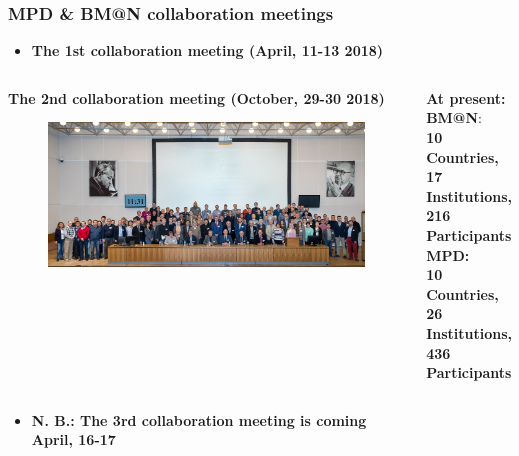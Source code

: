 \documentclass[dvipsnames] {beamer}
\begin{document}
\begin{frame}
  \frametitle{\bf \centering \footnotesize MPD \& BM@N collaboration meetings}
  
  \begin{block}{}
    \begin{itemize}
      \item \bf \centering \scriptsize The 1st collaboration meeting {\color{red} (April, 11-13 2018)}
    \end{itemize}
   \end{block}
  \begin{columns}[c]   
     \begin{block}{\bf \centering \scriptsize The 2nd collaboration meeting {\color{red} (October, 29-30 2018)}}
       \begin{figure}[H]
         \includegraphics[width=1.\linewidth]{2nd_collab.jpg}
       \end{figure}
     \end{block}
     
     {\footnotesize 
  \begin{block}{\bf \centering At present:}
    {\bf \color{red} BM@N}: \\ \bf	10 Countries, \\ 17 Institutions, \\ 216 Participants \\    
    {\bf \color{blue} MPD}: \\ \bf	10 Countries, \\ 26 Institutions, \\ 436 Participants   
  \end{block}
  }

  \end{columns}
  
  \begin{block}{}
    \begin{itemize}
      \item \bf \centering N. B.: The 3rd collaboration meeting is coming \\ {\color{red} April, 16-17}
    \end{itemize}
  \end{block}
\end{frame}
\end{document}
